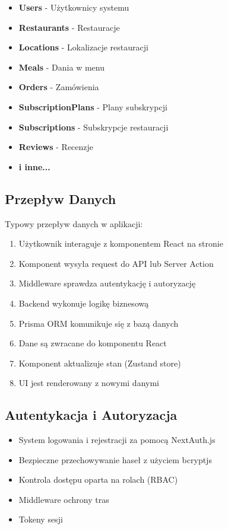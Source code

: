 \documentclass[12pt,a4paper,utf-8]{article}
\begin{document}
\begin{itemize}
    \item \textbf{Users}  -  Użytkownicy systemu
    \item \textbf{Restaurants}  -  Restauracje
    \item \textbf{Locations}  -  Lokalizacje restauracji
    \item \textbf{Meals}  -  Dania w menu
    \item \textbf{Orders}  -  Zamówienia
    \item \textbf{SubscriptionPlans}  -  Plany subskrypcji
    \item \textbf{Subscriptions}  -  Subskrypcje restauracji
    \item \textbf{Reviews}  -  Recenzje
    \item \textbf{i inne...}
\end{itemize}

\subsection{Przepływ Danych}

Typowy przepływ danych w aplikacji:

\begin{enumerate}
    \item Użytkownik interaguje z komponentem React na stronie
    \item Komponent wysyła request do API lub Server Action
    \item Middleware sprawdza autentykację i autoryzację
    \item Backend wykonuje logikę biznesową
    \item Prisma ORM komunikuje się z bazą danych
    \item Dane są zwracane do komponentu React
    \item Komponent aktualizuje stan (Zustand store)
    \item UI jest renderowany z nowymi danymi
\end{enumerate}

\newpage

\subsection{Autentykacja i Autoryzacja}

\begin{itemize}
    \item [OK] System logowania i rejestracji za pomocą NextAuth.js
    \item [OK] Bezpieczne przechowywanie haseł z użyciem bcryptjs
    \item [OK] Kontrola dostępu oparta na rolach (RBAC)
    \item [OK] Middleware ochrony tras
    \item [OK] Tokeny sesji
\end{itemize}
\end{document}
